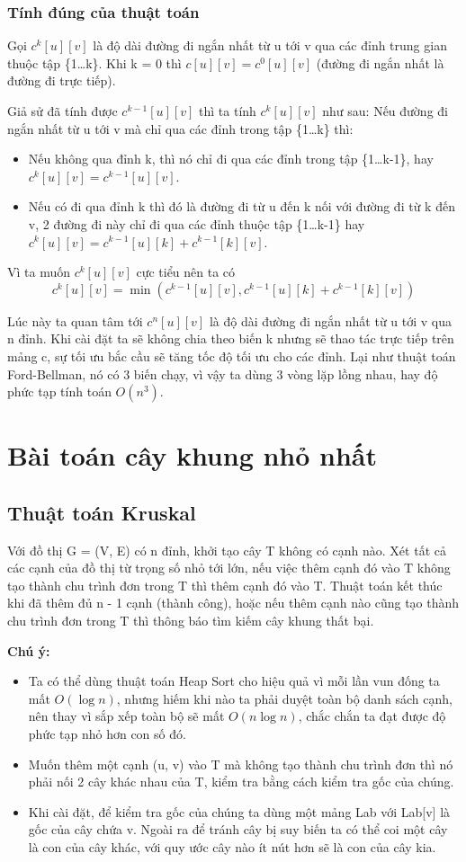 \subsubsection{Tính đúng của thuật toán}
Gọi $c^k[u][v]$ là độ dài đường đi ngắn nhất từ u tới v qua các đỉnh trung gian thuộc tập \{1\dots k\}. Khi k = 0 thì $c[u][v]=c^0[u][v]$ (đường đi ngắn nhất là đường đi trực tiếp).

Giả sử đã tính được $c^{k-1}[u][v]$ thì ta tính $c^k[u][v]$ như sau: Nếu đường đi ngắn nhất từ u tới v mà chỉ qua các đỉnh trong tập \{1\dots k\} thì:
\begin{itemize}
    \item Nếu không qua đỉnh k, thì nó chỉ đi qua các đỉnh trong tập \{1\dots k-1\}, hay $c^k[u][v]=c^{k-1}[u][v]$.
    \item Nếu có đi qua đỉnh k thì đó là đường đi từ u đến k nối với đường đi từ k đến v, 2 đường đi này chỉ đi qua các đỉnh thuộc tập \{1\dots k-1\} hay $c^k[u][v]=c^{k-1}[u][k]+c^{k-1}[k][v]$.
\end{itemize}
Vì ta muốn $c^k[u][v]$ cực tiểu nên ta có
$$c^k[u][v] = \min(c^{k-1}[u][v], c^{k-1}[u][k] + c^{k-1}[k][v])$$

Lúc này ta quan tâm tới $c^n[u][v]$ là độ dài đường đi ngắn nhất từ u tới v qua n đỉnh. Khi cài đặt ta sẽ không chia theo biến k nhưng sẽ thao tác trực tiếp trên mảng c, sự tối ưu bắc cầu sẽ tăng tốc độ tối ưu cho các đỉnh. Lại như thuật toán Ford-Bellman, nó có 3 biến chạy, vì vậy ta dùng 3 vòng lặp lồng nhau, hay độ phức tạp tính toán $O(n^3)$.

\section{Bài toán cây khung nhỏ nhất}
\subsection{Thuật toán Kruskal}
Với đồ thị G = (V, E) có n đỉnh, khởi tạo cây T không có cạnh nào. Xét tất cả các cạnh của đồ thị từ trọng số nhỏ tới lớn, nếu việc thêm cạnh đó vào T không tạo thành chu trình đơn trong T thì thêm cạnh đó vào T. Thuật toán kết thúc khi đã thêm đủ n - 1 cạnh (thành công), hoặc nếu thêm cạnh nào cũng tạo thành chu trình đơn trong T thì thông báo tìm kiếm cây khung thất bại.

\textbf{Chú ý:}
\begin{itemize}
    \item Ta có thể dùng thuật toán Heap Sort cho hiệu quả vì mỗi lần vun đống ta mất $O(\log n)$, nhưng hiếm khi nào ta phải duyệt toàn bộ danh sách cạnh, nên thay vì sắp xếp toàn bộ sẽ mất $O(n\log n)$, chắc chắn ta đạt được độ phức tạp nhỏ hơn con số đó.
    \item Muốn thêm một cạnh (u, v) vào T mà không tạo thành chu trình đơn thì nó phải nối 2 cây khác nhau của T, kiểm tra bằng cách kiểm tra gốc của chúng.
    \item Khi cài đặt, để kiểm tra gốc của chúng ta dùng một mảng Lab với Lab[v] là gốc của cây chứa v. Ngoài ra để tránh cây bị suy biến ta có thể coi một cây là con của cây khác, với quy ước cây nào ít nút hơn sẽ là con của cây kia.
\end{itemize}

